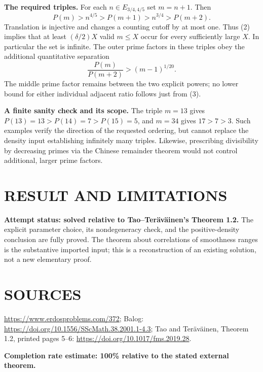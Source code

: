 \textbf{The required triples.} For each $n\in E_{3/4,4/5}$ set $m=n+1$. Then
\[
P(m)>n^{4/5}>P(m+1)>n^{3/4}>P(m+2).                       \tag{3}
\]
Translation is injective and changes a counting cutoff by at most one. Thus (2) implies that at least $(\delta/2)X$ valid $m\leq X$ occur for every sufficiently large $X$. In particular the set is infinite. The outer prime factors in these triples obey the additional quantitative separation
\[
\frac{P(m)}{P(m+2)}>(m-1)^{1/20}.
\]
The middle prime factor remains between the two explicit powers; no lower bound for either individual adjacent ratio follows just from (3).

\textbf{A finite sanity check and its scope.} The triple $m=13$ gives $P(13)=13>P(14)=7>P(15)=5$, and $m=34$ gives $17>7>3$. Such examples verify the direction of the requested ordering, but cannot replace the density input establishing infinitely many triples. Likewise, prescribing divisibility by decreasing primes via the Chinese remainder theorem would not control additional, larger prime factors.

\section{RESULT AND LIMITATIONS}
\textbf{Attempt status: solved relative to Tao--Ter\"av\"ainen's Theorem 1.2.} The explicit parameter choice, its nondegeneracy check, and the positive-density conclusion are fully proved. The theorem about correlations of smoothness ranges is the substantive imported input; this is a reconstruction of an existing solution, not a new elementary proof.

\section{SOURCES}
\url{https://www.erdosproblems.com/372}; Balog: \url{https://doi.org/10.1556/SScMath.38.2001.1-4.3}; Tao and Ter\"av\"ainen, Theorem 1.2, printed pages 5--6: \url{https://doi.org/10.1017/fms.2019.28}.

\textbf{Completion rate estimate: 100\% relative to the stated external theorem.}
